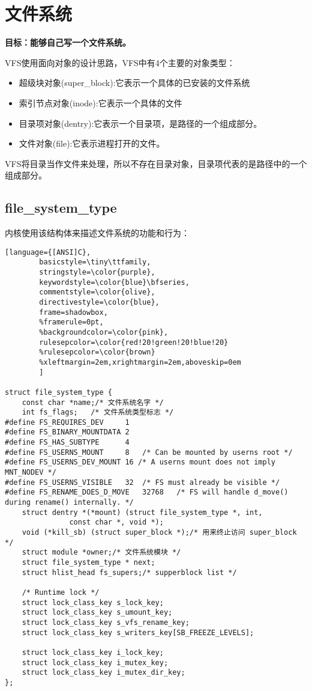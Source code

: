 \chapter{文件系统}


\textbf{目标：能够自己写一个文件系统。}

VFS使用面向对象的设计思路，VFS中有4个主要的对象类型：

\begin{itemize}
\item 超级块对象(super\_block):它表示一个具体的已安装的文件系统
\item 索引节点对象(inode):它表示一个具体的文件
\item 目录项对象(dentry):它表示一个目录项，是路径的一个组成部分。
\item 文件对象(file):它表示进程打开的文件。
\end{itemize}

VFS将目录当作文件来处理，所以不存在目录对象，目录项代表的是路径中的一个组成部分。



\section{file\_system\_type}

	内核使用该结构体来描述文件系统的功能和行为：

\begin{lstlisting}[language={[ANSI]C},
        basicstyle=\tiny\ttfamily,
        stringstyle=\color{purple},
        keywordstyle=\color{blue}\bfseries,
        commentstyle=\color{olive},
        directivestyle=\color{blue},
        frame=shadowbox,
        %framerule=0pt,
        %backgroundcolor=\color{pink},
        rulesepcolor=\color{red!20!green!20!blue!20}
        %rulesepcolor=\color{brown}
        %xleftmargin=2em,xrightmargin=2em,aboveskip=0em
        ]
        
struct file_system_type {
	const char *name;/* 文件系统名字 */
	int fs_flags;	/* 文件系统类型标志 */
#define FS_REQUIRES_DEV		1 
#define FS_BINARY_MOUNTDATA	2
#define FS_HAS_SUBTYPE		4
#define FS_USERNS_MOUNT		8	/* Can be mounted by userns root */
#define FS_USERNS_DEV_MOUNT	16 /* A userns mount does not imply MNT_NODEV */
#define FS_USERNS_VISIBLE	32	/* FS must already be visible */
#define FS_RENAME_DOES_D_MOVE	32768	/* FS will handle d_move() during rename() internally. */
	struct dentry *(*mount) (struct file_system_type *, int,
		       const char *, void *);
	void (*kill_sb) (struct super_block *);/* 用来终止访问 super_block */
	struct module *owner;/* 文件系统模块 */
	struct file_system_type * next;
	struct hlist_head fs_supers;/* supperblock list */

	/* Runtime lock */
	struct lock_class_key s_lock_key;
	struct lock_class_key s_umount_key;
	struct lock_class_key s_vfs_rename_key;
	struct lock_class_key s_writers_key[SB_FREEZE_LEVELS];

	struct lock_class_key i_lock_key;
	struct lock_class_key i_mutex_key;
	struct lock_class_key i_mutex_dir_key;
};
        
        
\end{lstlisting}

